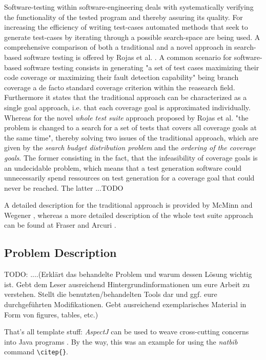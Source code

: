 \documentclass[pdftex,english,oribibl]{llncs}
\begin{document}
Software-testing within software-engineering deals with systematically verifying the functionality of the tested program and thereby assuring its quality. For increasing the efficiency of writing test-cases automated methods that seek to generate test-cases by iterating through a possible search-space are being used. A comprehensive comparison of both a traditional and a novel approach in search-based software testing is offered by Rojas et al. \citep{rojas2017detailed}. A common scenario for software-based software testing consists in generating "a set of test cases maximizing their code coverage or maximizing their fault detection capability" being branch coverage a de facto standard coverage criterion within the reasearch field. Furthermore it states that the traditional approach can be characterized as a single goal approach, i.e. that each coverage goal is approximated individually. Whereas for the novel \textit{whole test suite} approach proposed by Rojas et al. "the problem is changed to a search for a set of tests that covers all coverage goals at the same time", thereby solving two issues of the traditional approach, which are given by the \textit{search budget distribution problem} and the \textit{ordering of the coverage goals}. The former consisting in the fact, that the infeasibility of coverage goals is an undecidable problem, which means that a test generation software could unnecessarily spend ressources on test generation for a coverage goal that could never be reached. The latter ...TODO

A detailed description for the traditional approach is provided by McMinn \citep{mcminn2004search} and Wegener \citep{wegener2001evolutionary},  whereas a more detailed description of the whole test suite approach can be found at Fraser and Arcuri \citep{fraser2015achieving}.

\subsection{Problem Description} 


TODO:
....(Erklärt das behandelte Problem und warum dessen Lösung wichtig ist. Gebt dem Leser ausreichend Hintergrundinformationen um eure Arbeit zu verstehen. Stellt die benutzten/behandelten Tools dar und ggf. eure durchgeführten Modifikationen. Gebt ausreichend exemplarisches Material in Form von figures, tables, etc.)

That's all template stuff:  \textit{AspectJ} can be used to weave cross-cutting concerns into Java programs \citep{AspectJ2007}. By the way, this was an example for using the \textit{natbib} command \texttt{\textbackslash{}citep\{\}}.
\end{document}
